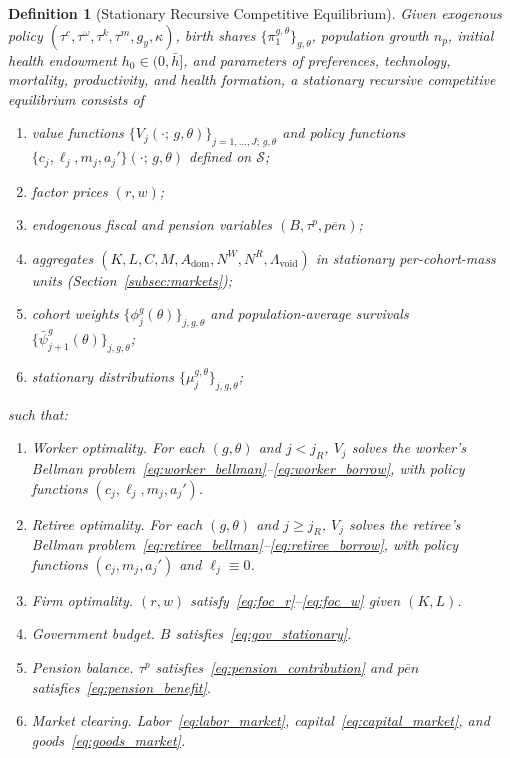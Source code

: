 \documentclass[12pt,a4paper]{article}
\newtheorem{definition}{Definition}
\begin{document}
\begin{definition}[Stationary Recursive Competitive Equilibrium]
\label{def:equilibrium}
Given exogenous policy $(\tau^c, \tau^\omega, \tau^k, \tau^m, g_y, \kappa)$, birth shares $\{\pi^{g,\theta}_1\}_{g,\theta}$, population growth $n_p$, initial health endowment $h_0 \in (0, \bar h]$, and parameters of preferences, technology, mortality, productivity, and health formation, a \emph{stationary recursive competitive equilibrium} consists of
\begin{enumerate}
\item value functions $\{V_j(\cdot;\, g, \theta)\}_{j=1,\ldots,J;\, g,\theta}$ and policy functions $\{c_j, \ell_j, m_j, a_j'\}(\cdot;\, g, \theta)$ defined on $\mathcal{S}$;
\item factor prices $(r, w)$;
\item endogenous fiscal and pension variables $(B, \tau^p, \overline{pen})$;
\item aggregates $(K, L, C, M, A_{\mathrm{dom}}, N^W, N^R, \Lambda_{\mathrm{void}})$ in stationary per-cohort-mass units (Section~\ref{subsec:markets});
\item cohort weights $\{\phi_j^{g}(\theta)\}_{j, g, \theta}$ and population-average survivals $\{\bar\psi_{j+1}^{g}(\theta)\}_{j, g, \theta}$;
\item stationary distributions $\{\mu_j^{g,\theta}\}_{j, g, \theta}$;
\end{enumerate}
such that:
\begin{enumerate}
\item \emph{Worker optimality.} For each $(g, \theta)$ and $j < j_R$, $V_j$ solves the worker's Bellman problem~\eqref{eq:worker_bellman}--\eqref{eq:worker_borrow}, with policy functions $(c_j, \ell_j, m_j, a_j')$.
\item \emph{Retiree optimality.} For each $(g, \theta)$ and $j \geq j_R$, $V_j$ solves the retiree's Bellman problem~\eqref{eq:retiree_bellman}--\eqref{eq:retiree_borrow}, with policy functions $(c_j, m_j, a_j')$ and $\ell_j \equiv 0$.
\item \emph{Firm optimality.} $(r, w)$ satisfy~\eqref{eq:foc_r}--\eqref{eq:foc_w} given $(K, L)$.
\item \emph{Government budget.} $B$ satisfies~\eqref{eq:gov_stationary}.
\item \emph{Pension balance.} $\tau^p$ satisfies~\eqref{eq:pension_contribution} and $\overline{pen}$ satisfies~\eqref{eq:pension_benefit}.
\item \emph{Market clearing.} Labor~\eqref{eq:labor_market}, capital~\eqref{eq:capital_market}, and goods~\eqref{eq:goods_market}.

\end{enumerate}
\end{definition}
\end{document}
